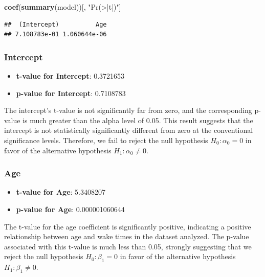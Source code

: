 \documentclass[
]{article}
\newenvironment{Shaded}{\begin{snugshade}}{\end{snugshade}}
\newcommand{\FunctionTok}[1]{\textcolor[rgb]{0.13,0.29,0.53}{\textbf{#1}}}
\newcommand{\NormalTok}[1]{#1}
\newcommand{\StringTok}[1]{\textcolor[rgb]{0.31,0.60,0.02}{#1}}
\providecommand{\tightlist}{%
  \setlength{\itemsep}{0pt}\setlength{\parskip}{0pt}}
\begin{document}
\begin{Shaded}
\begin{Highlighting}[]
\FunctionTok{coef}\NormalTok{(}\FunctionTok{summary}\NormalTok{(model))[, }\StringTok{"Pr(\textgreater{}|t|)"}\NormalTok{]}
\end{Highlighting}
\end{Shaded}

\begin{verbatim}
##  (Intercept)          Age 
## 7.108783e-01 1.060644e-06
\end{verbatim}

\hypertarget{intercept-1}{%
\subsubsection{Intercept}\label{intercept-1}}

\begin{itemize}
\tightlist
\item
  \textbf{t-value for Intercept}: 0.3721653
\item
  \textbf{p-value for Intercept}: 0.7108783
\end{itemize}

The intercept's t-value is not significantly far from zero, and the
corresponding p-value is much greater than the alpha level of 0.05. This
result suggests that the intercept is not statistically significantly
different from zero at the conventional significance levels. Therefore,
we fail to reject the null hypothesis \(H_0: \alpha_{0} = 0\) in favor
of the alternative hypothesis \(H_1: \alpha_{0} \neq 0\).

\hypertarget{age}{%
\subsubsection{Age}\label{age}}

\begin{itemize}
\tightlist
\item
  \textbf{t-value for Age}: 5.3408207
\item
  \textbf{p-value for Age}: 0.000001060644
\end{itemize}

The t-value for the age coefficient is significantly positive,
indicating a positive relationship between age and wake times in the
dataset analyzed. The p-value associated with this t-value is much less
than 0.05, strongly suggesting that we reject the null hypothesis
\(H_0: \beta_{1} = 0\) in favor of the alternative hypothesis
\(H_1: \beta_{1} \neq 0\).
\end{document}
